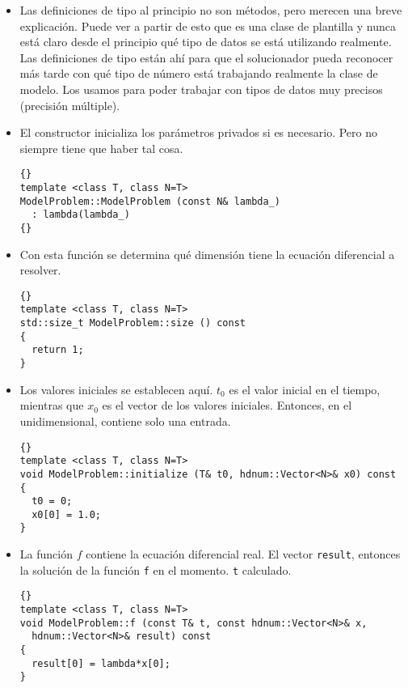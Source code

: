\begin{itemize}
\item Las definiciones de tipo al principio no son métodos, pero merecen una breve explicación. Puede ver a partir de esto que es una clase de plantilla y nunca está claro desde el principio qué tipo de datos se está utilizando realmente. Las definiciones de tipo están ahí para que el solucionador pueda reconocer más tarde con qué tipo de número está trabajando realmente la clase de modelo. Los usamos para poder trabajar con tipos de datos muy precisos (precisión múltiple).

\item El constructor inicializa los parámetros privados si es necesario. Pero no siempre tiene que haber tal cosa.

  {\footnotesize{\begin{lstlisting}{}
template <class T, class N=T>
ModelProblem::ModelProblem (const N& lambda_)
  : lambda(lambda_)
{}
\end{lstlisting}}}

\item Con esta función se determina qué dimensión tiene la ecuación diferencial a resolver.

{\footnotesize{\begin{lstlisting}{}
template <class T, class N=T>
std::size_t ModelProblem::size () const
{
  return 1;
}
\end{lstlisting}}}

\item Los valores iniciales se establecen aquí. $t_0$ es el valor inicial en el tiempo, mientras que $x_0$ es el vector de los valores iniciales. Entonces, en el unidimensional, contiene solo una entrada.

{\footnotesize{\begin{lstlisting}{}
template <class T, class N=T>
void ModelProblem::initialize (T& t0, hdnum::Vector<N>& x0) const
{
  t0 = 0;
  x0[0] = 1.0;
}
\end{lstlisting}}}

\item La función $f$ contiene la ecuación diferencial real.  El vector
 \lstinline{result},
  entonces la solución de la función \lstinline{f} en el momento.
  \lstinline{t} calculado.

{\footnotesize{\begin{lstlisting}{}
template <class T, class N=T>
void ModelProblem::f (const T& t, const hdnum::Vector<N>& x,
  hdnum::Vector<N>& result) const
{
  result[0] = lambda*x[0];
}
\end{lstlisting}}}


\end{itemize}
